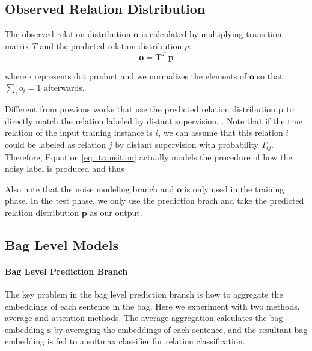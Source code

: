 \subsection{Observed Relation Distribution}
The observed relation distribution $\mathbf{o}$ is calculated by multiplying transition matrix $T$ and the predicted relation distribution $p$:
 \begin{equation}
\mathbf{o} = \mathbf{T}^T \bm\cdot \mathbf{p}
\label{eq_transition}
 \end{equation}

 where $\bm\cdot$ represents dot product and we normalizes the elements of $\mathbf{o}$ so that $\sum_i{o_i}=1$ afterwards.

Different from previous works that use the predicted relation distribution $\mathbf{p}$ to directly match the relation labeled by distant supervision. . Note that if the true relation of the input training instance is $i$, we can assume that this relation $i$ could be labeled as relation $j$ by distant supervision with probability $T_{ij}$. Therefore, Equation \ref{eq_transition} actually models the procedure of how the noisy label is produced and thus 

Also note that the noise modeling branch and $\mathbf{o}$ is only used in the training phase. In the test phase, we only use the prediction brach and take the predicted relation distribution $\mathbf{p}$ as our output. 

\subsection{Bag Level Models}
\paragraph{Bag Level Prediction Branch}
The key problem in the bag level prediction branch is how to aggregate the embeddings of each sentence in the bag. Here we experiment with two methods, average and attention methods. The average aggregation calculates the bag embedding $\mathbf{s}$ by averaging the embeddings of each sentence, and the resultant bag embedding is fed to a softmax classifier for relation classification.

